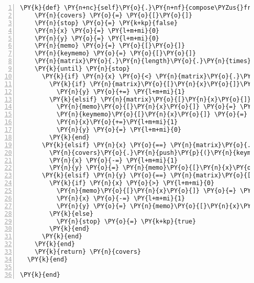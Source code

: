 \begin{Verbatim}[commandchars=\\\{\},numbers=left,firstnumber=1,stepnumber=1,xleftmargin=7mm, fontsize=\small]
  \PY{k}{def} \PY{n+nc}{self}\PY{o}{.}\PY{n+nf}{compose\PYZus{}from} \PY{n}{matrix}\PY{p}{,} \PY{n}{key}
    \PY{n}{covers} \PY{o}{=} \PY{o}{[}\PY{o}{]}
    \PY{n}{stop} \PY{o}{=} \PY{k+kp}{false}
    \PY{n}{x} \PY{o}{=} \PY{l+m+mi}{0}
    \PY{n}{y} \PY{o}{=} \PY{l+m+mi}{0}
    \PY{n}{memo} \PY{o}{=} \PY{o}{[}\PY{o}{]}
    \PY{n}{keymemo} \PY{o}{=} \PY{o}{[}\PY{o}{]}
    \PY{n}{matrix}\PY{o}{.}\PY{n}{length}\PY{o}{.}\PY{n}{times}\PY{p}{\PYZob{}}\PY{o}{|}\PY{n}{k}\PY{o}{|} \PY{n}{memo}\PY{o}{[}\PY{n}{k}\PY{o}{]} \PY{o}{=} \PY{l+m+mi}{0}\PY{p}{\PYZcb{}}
    \PY{k}{until} \PY{n}{stop}
      \PY{k}{if} \PY{n}{x} \PY{o}{<} \PY{n}{matrix}\PY{o}{.}\PY{n}{length} \PY{o+ow}{and} \PY{n}{y} \PY{o}{<} \PY{n}{matrix}\PY{o}{[}\PY{n}{x}\PY{o}{]}\PY{o}{.}\PY{n}{length}
        \PY{k}{if} \PY{n}{matrix}\PY{o}{[}\PY{n}{x}\PY{o}{]}\PY{o}{[}\PY{n}{y}\PY{o}{]} \PY{o}{==} \PY{l+m+mi}{0}
          \PY{n}{y} \PY{o}{+=} \PY{l+m+mi}{1}
        \PY{k}{elsif} \PY{n}{matrix}\PY{o}{[}\PY{n}{x}\PY{o}{]}\PY{o}{[}\PY{n}{y}\PY{o}{]} \PY{o}{==} \PY{l+m+mi}{1}
          \PY{n}{memo}\PY{o}{[}\PY{n}{x}\PY{o}{]} \PY{o}{=} \PY{n}{y}
          \PY{n}{keymemo}\PY{o}{[}\PY{n}{x}\PY{o}{]} \PY{o}{=} \PY{n}{key}\PY{o}{[}\PY{n}{y}\PY{o}{]}
          \PY{n}{x}\PY{o}{+=}\PY{l+m+mi}{1}
          \PY{n}{y} \PY{o}{=} \PY{l+m+mi}{0}
        \PY{k}{end}
      \PY{k}{elsif} \PY{n}{x} \PY{o}{==} \PY{n}{matrix}\PY{o}{.}\PY{n}{length}
        \PY{n}{covers}\PY{o}{.}\PY{n}{push}\PY{p}{(}\PY{n}{keymemo}\PY{o}{.}\PY{n}{dup}\PY{p}{)}
        \PY{n}{x} \PY{o}{-=} \PY{l+m+mi}{1}
        \PY{n}{y} \PY{o}{=} \PY{n}{memo}\PY{o}{[}\PY{n}{x}\PY{o}{]} \PY{o}{+} \PY{l+m+mi}{1}
      \PY{k}{elsif} \PY{n}{y} \PY{o}{==} \PY{n}{matrix}\PY{o}{[}\PY{n}{x}\PY{o}{]}\PY{o}{.}\PY{n}{length}
        \PY{k}{if} \PY{n}{x} \PY{o}{>} \PY{l+m+mi}{0}
          \PY{n}{memo}\PY{o}{[}\PY{n}{x}\PY{o}{]} \PY{o}{=} \PY{l+m+mi}{0}
          \PY{n}{x} \PY{o}{-=} \PY{l+m+mi}{1}
          \PY{n}{y} \PY{o}{=} \PY{n}{memo}\PY{o}{[}\PY{n}{x}\PY{o}{]} \PY{o}{+} \PY{l+m+mi}{1}
        \PY{k}{else}
          \PY{n}{stop} \PY{o}{=} \PY{k+kp}{true}
        \PY{k}{end}
      \PY{k}{end}
    \PY{k}{end}
    \PY{k}{return} \PY{n}{covers}
  \PY{k}{end}

\PY{k}{end}
\end{Verbatim}
